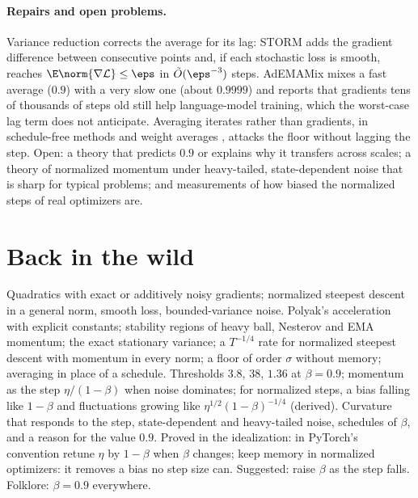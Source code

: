 \begin{refsection}
\paragraph{Repairs and open problems.} Variance reduction corrects the average for its lag: STORM \parencite{CutkoskyOrabona2019} adds the gradient difference between consecutive points and, if each stochastic loss is smooth, reaches $\E\norm{\nabla\Loss}\le\eps$ in $\tilde O(\eps^{-3})$ steps. AdEMAMix \parencite{PagliardiniAblinGrangier2025} mixes a fast average ($0.9$) with a very slow one (about $0.9999$) and reports that gradients tens of thousands of steps old still help language-model training, which the worst-case lag term does not anticipate. Averaging iterates rather than gradients, in schedule-free methods \parencite{DefazioEtAl2024} and weight averages \parencite{IzmailovEtAl2018}, attacks the floor without lagging the step. Open: a theory that predicts $0.9$ or explains why it transfers across scales; a theory of normalized momentum under heavy-tailed, state-dependent noise that is sharp for typical problems; and measurements of how biased the normalized steps of real optimizers are.

\section{Back in the wild}\label{sec:momentum:back}

{Quadratics with exact or additively noisy gradients; normalized steepest descent in a general norm, smooth loss, bounded-variance noise.}
{Polyak's acceleration with explicit constants; stability regions of heavy ball, Nesterov and EMA momentum; the exact stationary variance; a $T^{-1/4}$ rate for normalized steepest descent with momentum in every norm; a floor of order $\sigma$ without memory; averaging in place of a schedule.}
{Thresholds $3.8$, $38$, $1.36$ at $\beta=0.9$; momentum as the step $\eta/(1-\beta)$ when noise dominates; for normalized steps, a bias falling like $1-\beta$ and fluctuations growing like $\eta^{1/2}(1-\beta)^{-1/4}$ (derived).}
{Curvature that responds to the step, state-dependent and heavy-tailed noise, schedules of $\beta$, and a reason for the value $0.9$.}
{Proved in the idealization: in PyTorch's convention retune $\eta$ by $1-\beta$ when $\beta$ changes; keep memory in normalized optimizers: it removes a bias no step size can. Suggested: raise $\beta$ as the step falls. Folklore: $\beta=0.9$ everywhere.}


\end{refsection}
